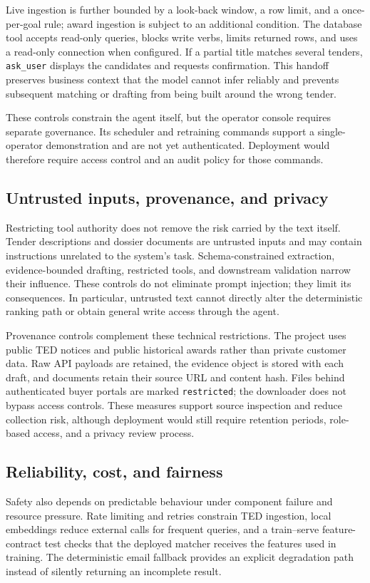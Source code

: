\documentclass[10pt,a4paper]{article}
\begin{document}
Live ingestion is further bounded by a look-back window, a row limit, and a once-per-goal rule; award ingestion is subject to an additional condition. The database tool accepts read-only queries, blocks write verbs, limits returned rows, and uses a read-only connection when configured. If a partial title matches several tenders, \texttt{ask\_user} displays the candidates and requests confirmation. This handoff preserves business context that the model cannot infer reliably and prevents subsequent matching or drafting from being built around the wrong tender.

These controls constrain the agent itself, but the operator console requires separate governance. Its scheduler and retraining commands support a single-operator demonstration and are not yet authenticated. Deployment would therefore require access control and an audit policy for those commands.

\subsection{Untrusted inputs, provenance, and privacy}
Restricting tool authority does not remove the risk carried by the text itself. Tender descriptions and dossier documents are untrusted inputs and may contain instructions unrelated to the system's task. Schema-constrained extraction, evidence-bounded drafting, restricted tools, and downstream validation narrow their influence. These controls do not eliminate prompt injection; they limit its consequences. In particular, untrusted text cannot directly alter the deterministic ranking path or obtain general write access through the agent.

Provenance controls complement these technical restrictions. The project uses public TED notices and public historical awards rather than private customer data. Raw API payloads are retained, the evidence object is stored with each draft, and documents retain their source URL and content hash. Files behind authenticated buyer portals are marked \texttt{restricted}; the downloader does not bypass access controls. These measures support source inspection and reduce collection risk, although deployment would still require retention periods, role-based access, and a privacy review process.

\subsection{Reliability, cost, and fairness}
Safety also depends on predictable behaviour under component failure and resource pressure. Rate limiting and retries constrain TED ingestion, local embeddings reduce external calls for frequent queries, and a train--serve feature-contract test checks that the deployed matcher receives the features used in training. The deterministic email fallback provides an explicit degradation path instead of silently returning an incomplete result.
\end{document}

